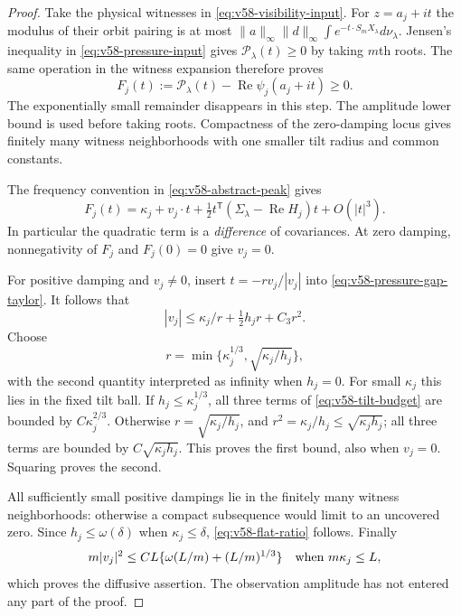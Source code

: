 \begin{proof}
Take the physical witnesses in \eqref{eq:v58-visibility-input}.
For $z=a_j+it$ the modulus of their orbit pairing is at most
$\|a\|_\infty\|d\|_\infty\int e^{-t\cdot S_mX_\lambda}d\nu_\lambda$.
Jensen's inequality in \eqref{eq:v58-pressure-input} gives
$\mathscr P_\lambda(t)\ge0$ by taking $m$th roots. The same operation
in the witness expansion therefore proves
\[
 F_j(t):=\mathscr P_\lambda(t)
                  -\operatorname{Re}\psi_j(a_j+it)\ge0.
\]
The exponentially small remainder disappears in this step. The
amplitude lower bound is used before taking roots. Compactness of the
zero-damping locus gives finitely many witness neighborhoods with one
smaller tilt radius and common constants.

The frequency convention in \eqref{eq:v58-abstract-peak} gives
\begin{equation}\label{eq:v58-pressure-gap-taylor}
 F_j(t)=\kappa_j+v_j\cdot t
       +\tfrac12t^{\mathsf T}
                  (\Sigma_\lambda-\operatorname{Re}H_j)t+O(|t|^3).
\end{equation}
In particular the quadratic term is a \emph{difference} of
covariances. At zero damping, nonnegativity of $F_j$ and $F_j(0)=0$
give $v_j=0$.

For positive damping and $v_j\ne0$, insert
$t=-r v_j/|v_j|$ into \eqref{eq:v58-pressure-gap-taylor}. It follows
that
\begin{equation}\label{eq:v58-tilt-budget}
                    |v_j|\le\kappa_j/r+\tfrac12h_jr+C_3r^2.
\end{equation}
Choose
\[
 r=\min\{\kappa_j^{1/3},\sqrt{\kappa_j/h_j}\},
\]
with the second quantity interpreted as infinity when $h_j=0$.
For small $\kappa_j$ this lies in the fixed tilt ball. If
$h_j\le\kappa_j^{1/3}$, all three terms of
\eqref{eq:v58-tilt-budget} are bounded by $C\kappa_j^{2/3}$.
Otherwise $r=\sqrt{\kappa_j/h_j}$, and
$r^2=\kappa_j/h_j\le\sqrt{\kappa_jh_j}$; all three terms are
bounded by $C\sqrt{\kappa_jh_j}$. This proves the first bound, also
when $v_j=0$. Squaring proves the second.

All sufficiently small positive dampings lie in the finitely many
witness neighborhoods: otherwise a compact subsequence would limit
to an uncovered zero. Since $h_j\le\omega(\delta)$ when
$\kappa_j\le\delta$, \eqref{eq:v58-flat-ratio} follows. Finally
\[
 m|v_j|^2\le CL\{\omega(L/m)+(L/m)^{1/3}\}
              \quad\hbox{when }m\kappa_j\le L,
\]
which proves the diffusive assertion. The observation amplitude
has not entered any part of the proof.
\end{proof}

